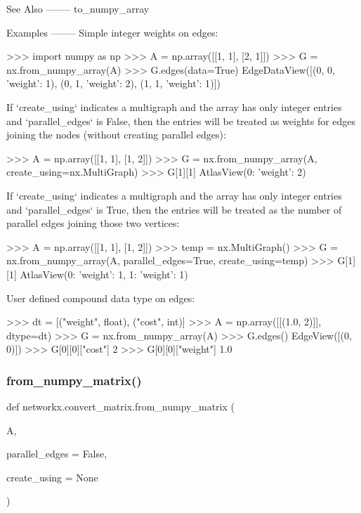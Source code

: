 \begin{DoxyVerb}
See Also
--------
to_numpy_array

Examples
--------
Simple integer weights on edges:

>>> import numpy as np
>>> A = np.array([[1, 1], [2, 1]])
>>> G = nx.from_numpy_array(A)
>>> G.edges(data=True)
EdgeDataView([(0, 0, {'weight': 1}), (0, 1, {'weight': 2}), (1, 1, {'weight': 1})])

If `create_using` indicates a multigraph and the array has only integer
entries and `parallel_edges` is False, then the entries will be treated
as weights for edges joining the nodes (without creating parallel edges):

>>> A = np.array([[1, 1], [1, 2]])
>>> G = nx.from_numpy_array(A, create_using=nx.MultiGraph)
>>> G[1][1]
AtlasView({0: {'weight': 2}})

If `create_using` indicates a multigraph and the array has only integer
entries and `parallel_edges` is True, then the entries will be treated
as the number of parallel edges joining those two vertices:

>>> A = np.array([[1, 1], [1, 2]])
>>> temp = nx.MultiGraph()
>>> G = nx.from_numpy_array(A, parallel_edges=True, create_using=temp)
>>> G[1][1]
AtlasView({0: {'weight': 1}, 1: {'weight': 1}})

User defined compound data type on edges:

>>> dt = [("weight", float), ("cost", int)]
>>> A = np.array([[(1.0, 2)]], dtype=dt)
>>> G = nx.from_numpy_array(A)
>>> G.edges()
EdgeView([(0, 0)])
>>> G[0][0]["cost"]
2
>>> G[0][0]["weight"]
1.0\end{DoxyVerb}
 \mbox{\label{namespacenetworkx_1_1convert__matrix_aac4b5517e3ce3b24f975ca22e5c52751}} 
\subsubsection{\texorpdfstring{from\+\_\+numpy\+\_\+matrix()}{from\_numpy\_matrix()}}
{\footnotesize\ttfamily def networkx.\+convert\+\_\+matrix.\+from\+\_\+numpy\+\_\+matrix (\begin{DoxyParamCaption}\item[{}]{A,  }\item[{}]{parallel\+\_\+edges = {\ttfamily False},  }\item[{}]{create\+\_\+using = {\ttfamily None} }\end{DoxyParamCaption})}

